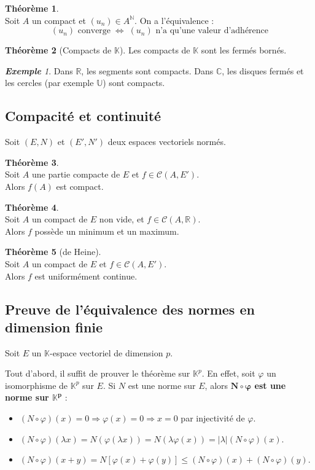 \documentclass[12pt]{book}
\let\ensembleNombre\mathbb
\newcommand*\N{\ensuremath{\ensembleNombre{N}}}
\newcommand*\R{\ensuremath{\ensembleNombre{R}}}
\newcommand*\C{\ensuremath{\ensembleNombre{C}}}
\newcommand*\K{\ensuremath{\ensembleNombre{K}}}
\theoremstyle{definition}
\newtheorem{thme}{Théorème}[chapter]
\theoremstyle{remark}
\newtheorem*{ex}{\textbf{Exemple}}
\newenvironment{fthme}
  {\begin{mdframed}[roundcorner=10pt, linewidth=2pt]\begin{thme}}
  {\end{thme}\end{mdframed}}
\begin{document}
	\begin{fthme}\mbox{~}\\
	Soit $A$ un compact et $(u_n) \in A^\N$. On a l'équivalence :
	\[ (u_n) \text{ converge} \;\Longleftrightarrow\; (u_n) \text{ n'a qu'une valeur d'adhérence} \]
	\end{fthme}
	
	\begin{fthme}[Compacts de $\K$]
	Les compacts de $\K$ sont les fermés bornés.
	\end{fthme}
	
	\begin{ex}
	Dans $\R$, les segments sont compacts. Dans $\C$, les disques fermés et les cercles (par exemple $\mathbb U$) sont compacts.
	\end{ex}
	
		\subsection{Compacité et continuité}
	Soit $(E,N)$ et $(E',N')$ deux espaces vectoriels normés.
	
	\begin{fthme}\mbox{~}\\
	Soit $A$ une partie compacte de $E$ et $f \in \mathcal C(A,E')$.\\
	Alors $f(A)$ est compact.
	\end{fthme}
	
	\begin{fthme}\mbox{~}\\
	Soit $A$ un compact de $E$ non vide, et $f \in \mathcal C(A,\R)$.\\
	Alors $f$ possède un minimum et un maximum.
	\end{fthme}
	
	\begin{fthme}[de Heine]\mbox{~}\\
	Soit $A$ un compact de $E$ et $f \in \mathcal C(A,E')$.\\
	Alors $f$ est uniformément continue.
	\end{fthme}
	
	\subsection{Preuve de l'équivalence des normes en dimension finie}
	Soit $E$ un $\K$-espace vectoriel de dimension $p$. 
	
	Tout d'abord, il suffit de prouver le théorème sur $\K^p$. En effet, soit $\varphi$ un isomorphisme de $\K^p$ sur $E$. Si $N$ est une norme sur $E$, alors \textbf{$\bm{N \circ \varphi}$ est une norme sur $\bm{\K^p }$} :
	\begin{itemize}
	\item $(N \circ \varphi)(x) = 0 \Longrightarrow \varphi(x) = 0 \Longrightarrow x = 0$ par injectivité de $\varphi$.
	\item $(N \circ \varphi)(\lambda x) = N(\varphi(\lambda x)) = N(\lambda \varphi(x)) = |\lambda|(N\circ \varphi)(x)$.
	\item $(N \circ \varphi)(x+y) = N[\varphi(x) + \varphi(y)] \leq (N\circ \varphi)(x) + (N \circ \varphi)(y)$.
	\end{itemize}
	
\end{document}

